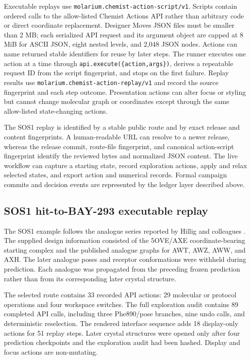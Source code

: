 \documentclass[11pt]{article}
\begin{document}
\begin{small}
Executable replays use \texttt{molarium.chemist-action-script/v1}. Scripts contain ordered calls to the allow-listed Chemist Actions API rather than arbitrary code or direct coordinate replacement. Designer Moves JSON files must be smaller than 2 MB; each serialized API request and its argument object are capped at 8 MiB for ASCII JSON, eight nested levels, and 2,048 JSON nodes. Actions can name returned stable identifiers for reuse by later steps. The runner executes one action at a time through \texttt{api.execute(\{action,args\})}, derives a repeatable request ID from the script fingerprint, and stops on the first failure. Replay results use \texttt{molarium.chemist-action-replay/v1} and record the source fingerprint and each step outcome. Presentation actions can alter focus or styling but cannot change molecular graph or coordinates except through the same allow-listed state-changing actions.

The SOS1 replay is identified by a stable public route and by exact release and content fingerprints. A human-readable URL can resolve to a newer release, whereas the release commit, route-file fingerprint, and canonical action-script fingerprint identify the reviewed bytes and normalized JSON content. The live workflow can capture a starting state, record exploration actions, apply and relax selected states, and export action and numerical records. Formal campaign commits and decision events are represented by the ledger layer described above.

\subsection{SOS1 hit-to-BAY-293 executable replay}

The SOS1 example follows the analogue series reported by Hillig and colleagues \citep{hillig2019sos1}. The supplied design information consisted of the 5OVE/AXE coordinate-bearing starting complex and the published analogue graphs for AWT, AWZ, AWW, and AXH. The later analogue poses and receptor conformations were withheld during prediction. Each analogue was propagated from the preceding frozen prediction rather than from its corresponding later crystal structure.

The selected route contains 33 recorded API actions: 29 molecular or protocol operations and four workspace switches. The full exploration audit contains 89 completed API calls, including three Phe890/pose branches, nine undo calls, and deterministic reselection. The rendered interface sequence adds 18 display-only actions for 51 replay steps. Later crystal structures were opened only after four prediction checkpoints and the exploration audit had been hashed. Display and focus actions are non-mutating.


\end{small}
\end{document}

